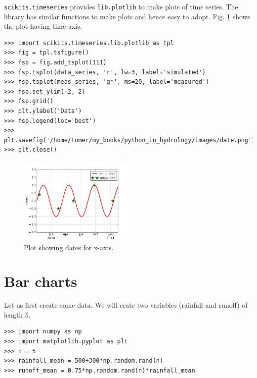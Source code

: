 \documentclass[10pt]{book}
\begin{document}
{\verb"scikits.timeseries" provides \verb"lib.plotlib" to make plots of time series. The library has similar functions to make plots  and hence easy to adopt. Fig. \ref{fig:date} shows the plot having time axis. 

\beforeverb \begin{verbatim}
>>> import scikits.timeseries.lib.plotlib as tpl
>>> fig = tpl.tsfigure()
>>> fsp = fig.add_tsplot(111)
>>> fsp.tsplot(data_series, 'r', lw=3, label='simulated')
>>> fsp.tsplot(meas_series, 'g*', ms=20, label='measured')
>>> fsp.set_ylim(-2, 2)
>>> fsp.grid()
>>> plt.ylabel('Data')
>>> fsp.legend(loc='best')
>>> plt.savefig('/home/tomer/my_books/python_in_hydrology/images/date.png')
>>> plt.close()
\end{verbatim} \afterverb

\beforefig
\begin{figure}[h!]
  \centering
    \includegraphics[width=0.5\textwidth]{images/date.png}
  \caption{Plot showing dates for x-axis.}
   \label{fig:date}
\end{figure}
\afterfig

\section{Bar charts}
Let us first create some data. We will crate two variables (rainfall and runoff) of length 5. 
\beforeverb \begin{verbatim}
>>> import numpy as np
>>> import matplotlib.pyplot as plt
>>> n = 5
>>> rainfall_mean = 500+300*np.random.rand(n)
>>> runoff_mean = 0.75*np.random.rand(n)*rainfall_mean
\end{verbatim} \afterverb

}
\end{document}
